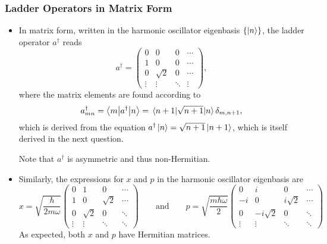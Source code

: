 \documentclass[11pt, a4paper]{article}
\newcommand{\eqtext}[1]{\qquad \text{#1} \qquad}
\newcommand{\Herm}{Hermitian\xspace}
\newcommand{\bmel}[3]{\big \langle {#1} \big | {#2} \big | {#3} \big \rangle}  %
\begin{document}
\subsubsection{Ladder Operators in Matrix Form}
\begin{itemize}

    \item In matrix form, written in the harmonic oscillator eigenbasis $ \{\ket{n}\} $, the ladder operator $ a^{\dagger} $ reads
    \begin{equation*}
        a^{\dagger} =
        \begin{pmatrix}
        0 & 0 & 0 & \cdots\\
        1 & 0 & 0 & \cdots\\
        0 & \sqrt{2} & 0 & \cdots\\
        \vdots & \vdots & \ddots & \vdots
        \end{pmatrix},
	\end{equation*}
    where the matrix elements are found according to
	\begin{equation*}
		a^{\dagger}_{mn} = \bmel{m}{a^{\dagger}}{n} = \mel{n+1}{\sqrt{n+1}}{n}\delta_{m, n+1},
	\end{equation*}
    which is derived from the equation $ a^{\dagger}\ket{n} = \sqrt{n+1}\ket{n+1} $, which is itself derived in the next question.

    Note that $ a^{\dagger} $ is asymmetric and thus non-\Herm. 
	
	\item Similarly, the expressions for $ x $ and $ p $ in the harmonic oscillator eigenbasis are
	\begin{equation*}
		x = \sqrt{\frac{\hbar}{2m\omega}} 
		\begin{pmatrix}
		0 & 1 & 0 & \cdots\\
		1 & 0 & \sqrt{2} & \cdots\\
		0 & \sqrt{2} & 0 & \ddots\\
		\vdots & \vdots & \ddots & \ddots
		\end{pmatrix}
		\eqtext{and}
		p = \sqrt{\frac{m\hbar \omega}{2}} 
		\begin{pmatrix}
		0 & i & 0 & \cdots\\
		-i & 0 & i\sqrt{2} & \cdots\\
		0 & -i\sqrt{2} & 0 & \ddots\\
		\vdots & \vdots & \ddots & \ddots
		\end{pmatrix}
	\end{equation*}
	As expected, both $ x $ and $ p $ have \Herm matrices.
\end{itemize}
\end{document}
